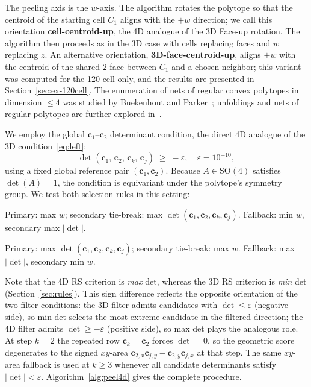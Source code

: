 \documentclass[12pt]{article}
\theoremstyle{definition}
\begin{document}
The peeling axis is the $w$-axis.
The algorithm rotates the polytope so that the centroid of the starting
cell $C_1$ aligns with the $+w$ direction; we call this orientation
\textbf{cell-centroid-up}, the 4D analogue of the 3D Face-up rotation.
The algorithm then proceeds as in the 3D case with cells replacing
faces and $w$ replacing $z$.
An alternative orientation, \textbf{3D-face-centroid-up}, aligns
$+w$ with the centroid of the shared 2-face between $C_1$ and a
chosen neighbor; this variant was computed for the 120-cell only,
and the results are presented in Section~\ref{sec:ex-120cell}.
The enumeration of nets of regular convex polytopes in dimension $\le 4$
was studied by Buekenhout and Parker~\cite{Buekenhout1998};
unfoldings and nets of regular polytopes are further explored
in~\cite{Devadoss2022}.

We employ the global $\mathbf{c}_1$--$\mathbf{c}_2$ determinant condition,
the direct 4D analogue of the 3D condition~\eqref{eq:left}:
\begin{equation}
  \det(\mathbf{c}_1,\,\mathbf{c}_2,\,\mathbf{c}_k,\,\mathbf{c}_j) \;\ge\; -\varepsilon,
  \quad \varepsilon = 10^{-10},
  \label{eq:4dleft}
\end{equation}
using a fixed global reference pair $(\mathbf{c}_1, \mathbf{c}_2)$.
Because $A\in\mathrm{SO}(4)$ satisfies $\det(A)=1$, the condition is
equivariant under the polytope's symmetry group.
We test both selection rules in this setting:
\begin{description}[nosep]
  \item[RZ (Zonal rule)] Primary: max $w$; secondary tie-break: max
    $\det(\mathbf{c}_1,\mathbf{c}_2,\mathbf{c}_k,\mathbf{c}_j)$.
    Fallback: min $w$, secondary max $|\det|$.
  \item[RS (Spiral rule)] Primary: max
    $\det(\mathbf{c}_1,\mathbf{c}_2,\mathbf{c}_k,\mathbf{c}_j)$;
    secondary tie-break: max $w$.
    Fallback: max $|\det|$, secondary min $w$.
\end{description}
Note that the 4D RS criterion is \emph{max} det, whereas the 3D RS
criterion is \emph{min} det (Section~\ref{sec:rules}).
This sign difference reflects the opposite orientation of the two
filter conditions: the 3D filter admits candidates with
$\det\le\varepsilon$ (negative side), so min det selects the most
extreme candidate in the filtered direction; the 4D filter admits
$\det\ge-\varepsilon$ (positive side), so max det plays the
analogous role.
At step $k=2$ the repeated row $\mathbf{c}_k=\mathbf{c}_2$ forces
$\det=0$, so the geometric score degenerates to the signed
$xy$-area $\mathbf{c}_{2,x}\mathbf{c}_{j,y}-\mathbf{c}_{2,y}\mathbf{c}_{j,x}$ at that step.
The same $xy$-area fallback is used at $k\ge 3$ whenever all candidate
determinants satisfy $|\det|<\varepsilon$.
Algorithm~\ref{alg:peel4d} gives the complete procedure.
\end{document}
